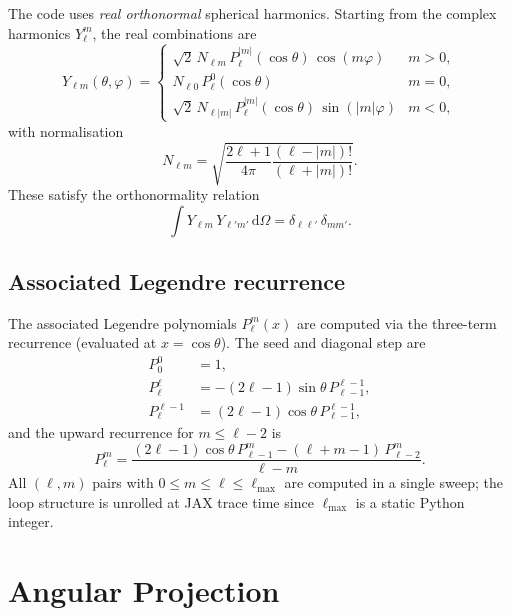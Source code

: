 \documentclass[11pt]{article}
\begin{document}
The code uses \emph{real orthonormal} spherical harmonics.  Starting from the
complex harmonics $Y_\ell^m$, the real combinations are
\begin{equation}
  Y_{\ell m}(\theta,\varphi) =
  \begin{cases}
    \sqrt{2}\, N_{\ell m}\, P_\ell^{|m|}(\cos\theta)\,\cos(m\varphi)
      & m > 0, \\
    N_{\ell 0}\, P_\ell^0(\cos\theta)
      & m = 0, \\
    \sqrt{2}\, N_{\ell |m|}\, P_\ell^{|m|}(\cos\theta)\,\sin(|m|\varphi)
      & m < 0,
  \end{cases}
\end{equation}
with normalisation
\begin{equation}
  N_{\ell m} = \sqrt{\frac{2\ell+1}{4\pi}\frac{(\ell-|m|)!}{(\ell+|m|)!}}.
\end{equation}
These satisfy the orthonormality relation
\begin{equation}
  \int Y_{\ell m}\, Y_{\ell' m'}\,\mathrm{d}\Omega
  = \delta_{\ell\ell'}\,\delta_{mm'}.
\end{equation}

\subsection{Associated Legendre recurrence}

The associated Legendre polynomials $P_\ell^m(x)$ are computed via the
three-term recurrence (evaluated at $x = \cos\theta$).  The seed and diagonal
step are
\begin{align}
  P_0^0 &= 1, \\
  P_\ell^\ell &= -(2\ell-1)\sin\theta\, P_{\ell-1}^{\ell-1}, \\
  P_\ell^{\ell-1} &= (2\ell-1)\cos\theta\, P_{\ell-1}^{\ell-1},
\end{align}
and the upward recurrence for $m \leq \ell - 2$ is
\begin{equation}
  P_\ell^m = \frac{(2\ell-1)\cos\theta\, P_{\ell-1}^m
             - (\ell+m-1)\, P_{\ell-2}^m}{\ell - m}.
\end{equation}
All $(\ell,m)$ pairs with $0 \leq m \leq \ell \leq \ell_{\max}$ are computed
in a single sweep; the loop structure is unrolled at JAX trace time since
$\ell_{\max}$ is a static Python integer.

\section{Angular Projection}
\end{document}
